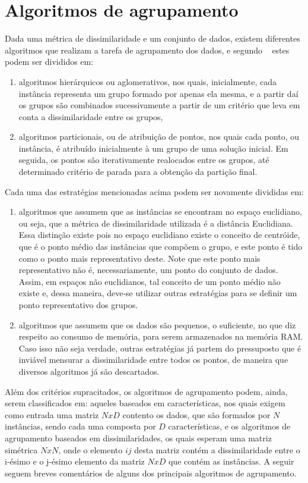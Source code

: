 \section{Algoritmos de agrupamento}

Dada uma métrica de dissimilaridade e um conjunto de dados, existem diferentes algoritmos que realizam a tarefa de agrupamento dos dados, e segundo ~\parencite[][243]{Ullman} estes podem ser divididos em:

\begin{enumerate}
	\item  algoritmos hierárquicos ou aglomerativos, nos quais, inicialmente, cada instância representa um grupo formado por apenas ela mesma, e a partir daí os grupos são combinados sucessivamente a partir de um critério que leva em conta a dissimilaridade entre os grupos,
	\item algoritmos particionais, ou de atribuição de pontos, nos quais cada ponto, ou instância, é atribuído inicialmente à um grupo de uma solução inicial. Em seguida, os pontos são iterativamente realocados entre os grupos, até determinado critério de parada para a obtenção da partição final.
\end{enumerate}
Cada uma das estratégias mencionadas acima podem ser novamente divididas em:

\begin{enumerate}
	\item algoritmos que assumem que as instâncias se encontram no espaço euclidiano, ou seja, que a métrica de dissimilaridade utilizada é a distância Euclidiana. Essa distinção existe pois no espaço euclidiano existe o conceito de centróide, que é o ponto médio das instâncias que compõem o grupo, e este ponto é tido como o ponto mais representativo deste. Note que este ponto mais representativo não é, necessariamente, um ponto do conjunto de dados. Assim, em espaços não euclidianos, tal conceito de um ponto médio não existe e, dessa maneira, deve-se utilizar outras estratégias para se definir um ponto representativo dos grupos.
	\item algoritmos que assumem que os dados são pequenos, o suficiente, no que diz respeito ao consumo de memória, para serem armazenados na memória RAM. Caso isso não seja verdade, outras estratégias já partem do pressuposto que é inviável mensurar a dissimilaridade entre todos os pontos, de maneira que diversos algoritmos já são descartados. 
\end{enumerate}

Além dos critérios supracitados, os algoritmos de agrupamento podem, ainda, serem classificados em: aqueles baseados em características, nos quais exigem como entrada uma matriz $NxD$ contento os dados, que são formados por $N$ instâncias, sendo cada uma composta por $D$ características, e os algoritmos de agrupamento baseados em dissimilaridades, os quais esperam uma matriz simétrica $NxN$, onde o elemento $ij$ desta matriz contém a dissimilaridade entre o i-ésimo e o j-ésimo elemento da matriz $NxD$ que contém as instâncias. A seguir seguem breves comentários de alguns dos principais algoritmos de agrupamento.

